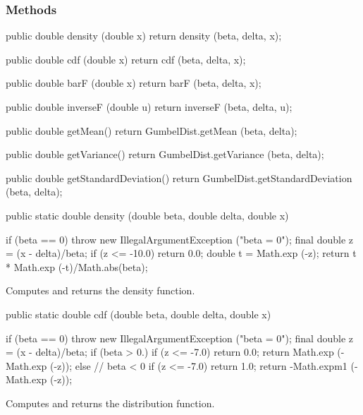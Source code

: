 \subsubsection* {Methods}
\begin{code}\begin{hide}

   public double density (double x) {
      return density (beta, delta, x);
   }

   public double cdf (double x) {
      return cdf (beta, delta, x);
   }

   public double barF (double x) {
      return barF (beta, delta, x);
   }

   public double inverseF (double u) {
      return inverseF (beta, delta, u);
   }

   public double getMean() {
      return GumbelDist.getMean (beta, delta);
   }

   public double getVariance() {
      return GumbelDist.getVariance (beta, delta);
   }

   public double getStandardDeviation() {
      return GumbelDist.getStandardDeviation (beta, delta);
   }\end{hide}

   public static double density (double beta, double delta, double x)\begin{hide} {
      if (beta == 0)
         throw new IllegalArgumentException ("beta = 0");
      final double z = (x - delta)/beta;
      if (z <= -10.0)
         return 0.0;
      double t = Math.exp (-z);
      return  t * Math.exp (-t)/Math.abs(beta);
   }\end{hide}
\end{code}
\begin{tabb} Computes and returns the density function.
\end{tabb}
\begin{code}

   public static double cdf (double beta, double delta, double x)\begin{hide} {
      if (beta == 0)
         throw new IllegalArgumentException ("beta = 0");
      final double z = (x - delta)/beta;
      if (beta > 0.) {
         if (z <= -7.0)
            return 0.0;
         return Math.exp (-Math.exp (-z));
      } else {   // beta < 0
          if (z <= -7.0)
            return 1.0;
         return -Math.expm1 (-Math.exp (-z));
     }
   }\end{hide}
\end{code}
 \begin{tabb}
  Computes and returns  the distribution function.
 \end{tabb}
